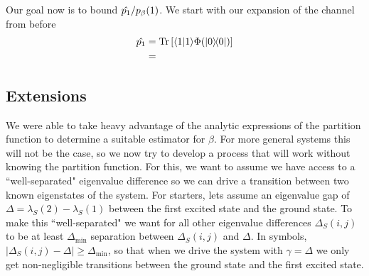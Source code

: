 \documentclass{article}
\newcommand{\braket}[2]{\langle #1|#2\rangle}
\newcommand{\ketbra}[2]{| #1\rangle\! \langle #2|}
\newcommand{\brackets}[1]{\left[ #1 \right]}
\DeclareMathOperator{\Tr}{Tr}
\newcommand{\trace}[1]{\Tr \brackets{ #1 }}
\begin{document}
Our goal now is to bound $\Hat{p_1} / p_{\beta}(1)$. We start with our expansion of the channel from before
\begin{align}
    \Hat{p_1} &= \trace{\braket{1}{1} \Phi(\ketbra{0}{0})} \\
    &= 
\end{align}

\subsection{Extensions}
We were able to take heavy advantage of the analytic expressions of the partition function to determine a suitable estimator for $\beta$. For more general systems this will not be the case, so we now try to develop a process that will work without knowing the partition function. For this, we want to assume we have access to a ``well-separated" eigenvalue difference so we can drive a transition between two known eigenstates of the system. For starters, lets assume an eigenvalue gap of $\Delta = \lambda_S(2) - \lambda_S(1)$ between the first excited state and the ground state. To make this ``well-separated" we want for all other eigenvalue differences $\Delta_S(i,j)$ to be at least $\Delta_{\min}$ separation between $\Delta_S(i,j)$ and $\Delta$. In symbols, $|\Delta_S(i,j) - \Delta| \ge \Delta_{\min}$, so that when we drive the system with $\gamma = \Delta$ we only get non-negligible transitions between the ground state and the first excited state. 
\end{document}
